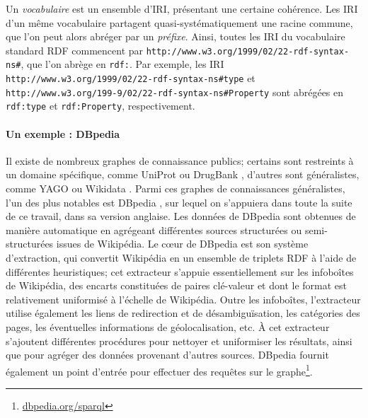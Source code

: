 Un \textit{vocabulaire} est un ensemble d'IRI, présentant une certaine cohérence. Les IRI d'un même vocabulaire partagent quasi-systématiquement une racine commune, que l'on peut alors abréger par un \textit{préfixe}. Ainsi, toutes les IRI du vocabulaire standard RDF commencent par \texttt{http://www.w3.org/1999/02/22-rdf-syntax-ns\#}, que l'on abrège en \texttt{rdf:}. Par exemple, les IRI \texttt{http://www.w3.org/1999/02/22-rdf-syntax-ns\#type} et \texttt{http://www.w3.org/199-9/02/22-rdf-syntax-ns\#Property} sont abrégées en \texttt{rdf:type} et \texttt{rdf:Property}, respectivement. 




\paragraph{Un exemple : DBpedia}

Il existe de nombreux graphes de connaissance publics; certains sont restreints à un domaine spécifique, comme UniProt \cite{uniprot2017uniprot} ou DrugBank \cite{wishart2018drugbank}, %
d'autres sont généralistes, comme YAGO \cite{suchanek2008yago} ou Wikidata \cite{vrandevcic2014wikidata}. Parmi ces graphes de connaissances généralistes, l'un des plus notables est DBpedia \cite{auer2007dbpedia}, sur lequel on s'appuiera dans toute la suite de ce travail, dans sa version anglaise. Les données de DBpedia sont obtenues de manière automatique en agrégeant différentes sources structurées ou semi-structurées issues de Wikipédia. Le cœur de DBpedia est son système d'extraction, qui convertit Wikipédia en un ensemble de triplets RDF à l'aide de différentes heuristiques; cet extracteur s'appuie essentiellement sur les infoboîtes de Wikipédia, des encarts constituées de paires clé-valeur et dont le format est relativement uniformisé à l'échelle de Wikipédia. Outre les infoboîtes, l'extracteur utilise également les liens de redirection et de désambiguïsation, les catégories des pages, les éventuelles informations de géolocalisation, etc. À cet extracteur s'ajoutent différentes procédures pour nettoyer et uniformiser les résultats, ainsi que pour agréger des données provenant d'autres sources. DBpedia fournit également un point d'entrée pour effectuer des requêtes sur le graphe\footnote{\href{https://dbpedia.org/sparql}{dbpedia.org/sparql}}.

